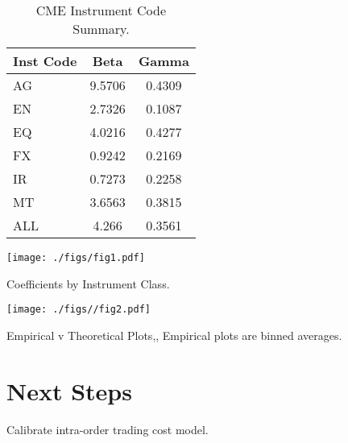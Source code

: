 \documentclass{article}
\begin{document}
\begin{table}
\centering
\begin{tabular}{|l|c|c|}
\hline
Inst Code & Beta & Gamma \\
\hline
AG & 9.5706 & 0.4309 \\
EN & 2.7326 & 0.1087 \\
EQ & 4.0216 & 0.4277 \\
FX & 0.9242 & 0.2169 \\
IR & 0.7273 & 0.2258 \\
MT & 3.6563 & 0.3815\\
\hline
\hline
ALL & 4.266 & 0.3561 \\
\hline
\end{tabular}
\caption{CME Instrument Code Summary.}
\label{tab:template}
\end{table}

\texttt{[image: ./figs/fig1.pdf]}

Coefficients by Instrument Class.

\texttt{[image: ./figs//fig2.pdf]}

Empirical v Theoretical Plots,, Empirical plots are binned averages.

\section*{Next Steps}
Calibrate intra-order trading cost model.



\end{document}
